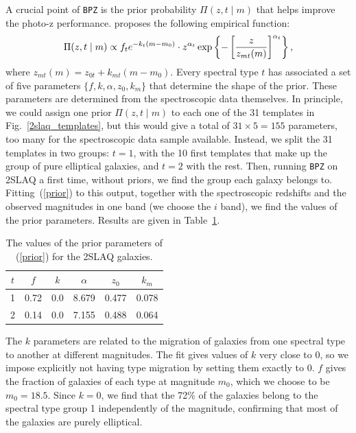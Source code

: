 A crucial point of \texttt{BPZ} is the prior probability $\Pi(z, t \mid m)$ that helps improve the photo-z performance. \citet{Benitez2000} proposes the following empirical function:
\begin{equation}
\Pi(z, t \mid m) \propto f_t e^{-k_t(m-m_0)} \cdot z^{\alpha_t}\exp \left\lbrace -\left[ {z \over z_{mt}(m)} \right]^{\alpha_t} \right\rbrace,
\label{prior}
\end{equation}
where $z_{mt}(m) = z_{0t} + k_{mt}(m-m_0)$. Every spectral type $t$ has associated a set of five parameters $\lbrace f,k,\alpha,z_0,k_{m} \rbrace$ that determine the shape of the prior. These parameters are determined from the spectroscopic data themselves. In principle, we could assign one prior $\Pi(z, t \mid m)$ to each one of the 31 templates in Fig.~\ref{2slaq_templates}, but this would give a total of $31\times5=155$ parameters, too many for the spectroscopic data sample available. Instead, we split the 31 templates in two groups: $t=1$, with the 10 first templates that make up the group of pure elliptical galaxies, and $t=2$ with the rest. Then, running \texttt{BPZ} on 2SLAQ a first time, without priors, we find the group each galaxy belongs to. Fitting~(\ref{prior}) to this output, together with the spectroscopic redshifts and the observed magnitudes in one band (we choose the $i$ band), we find the values of the prior parameters. Results are given in Table~\ref{tab:prior}.
\begin{table}
\centering
\begin{tabular}{cccccc}
\hline
$t$ & $f$ & $k$ & $\alpha$ & $z_0$ & $k_{m}$ \\ \hline
1 & 0.72 & 0.0 & 8.679 & 0.477 & 0.078\\
2 & 0.14 & 0.0 & 7.155 & 0.488 & 0.064\\
\hline
\end{tabular}
\caption{The values of the prior parameters of (\ref{prior}) for the 2SLAQ galaxies.}
\label{tab:prior}
\end{table}

The $k$ parameters are related to the migration of galaxies from one spectral type to another at different magnitudes. The fit gives values of $k$ very close to 0, so we impose explicitly not having type migration by setting them exactly to 0. $f$ gives the fraction of galaxies of each type at magnitude $m_0$, which we choose to be $m_0=18.5$. Since $k=0$, we find that the 72\% of the galaxies belong to the spectral type group 1 independently of the magnitude, confirming that most of the galaxies are purely elliptical.

